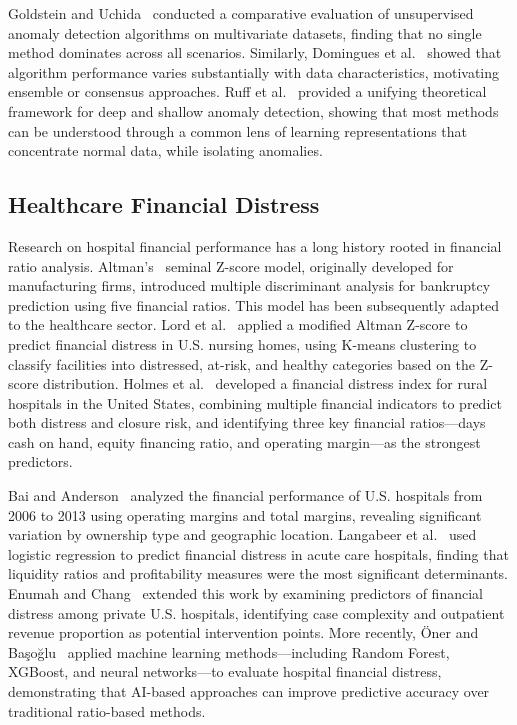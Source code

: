 \documentclass{ieeeaccess}
\begin{document}
Goldstein and Uchida~\cite{goldstein2016comparative} conducted a comparative evaluation of unsupervised anomaly detection algorithms on multivariate datasets, finding that no single method dominates across all scenarios. Similarly, Domingues et al.~\cite{domingues2018comparative} showed that algorithm performance varies substantially with data characteristics, motivating ensemble or consensus approaches. Ruff et al.~\cite{ruff2021unifying} provided a unifying theoretical framework for deep and shallow anomaly detection, showing that most methods can be understood through a common lens of learning representations that concentrate normal data, while isolating anomalies.

\subsection{Healthcare Financial Distress}
\label{subsec:healthcare_distress}
Research on hospital financial performance has a long history rooted in financial ratio analysis. Altman's~\cite{altman1968financial} seminal Z-score model, originally developed for manufacturing firms, introduced multiple discriminant analysis for bankruptcy prediction using five financial ratios. This model has been subsequently adapted to the healthcare sector. Lord et al.~\cite{lord2020predicting} applied a modified Altman Z-score to predict financial distress in U.S. nursing homes, using K-means clustering to classify facilities into distressed, at-risk, and healthy categories based on the Z-score distribution. Holmes et al.~\cite{holmes2017predicting} developed a financial distress index for rural hospitals in the United States, combining multiple financial indicators to predict both distress and closure risk, and identifying three key financial ratios---days cash on hand, equity financing ratio, and operating margin---as the strongest predictors.

Bai and Anderson~\cite{bai2016analysis} analyzed the financial performance of U.S. hospitals from 2006 to 2013 using operating margins and total margins, revealing significant variation by ownership type and geographic location. Langabeer et al.~\cite{langabeer2018predicting} used logistic regression to predict financial distress in acute care hospitals, finding that liquidity ratios and profitability measures were the most significant determinants. Enumah and Chang~\cite{holmes2021predictors} extended this work by examining predictors of financial distress among private U.S. hospitals, identifying case complexity and outpatient revenue proportion as potential intervention points. More recently, {\"O}ner and Ba{\c{s}}o{\u{g}}lu~\cite{oner2024hospital} applied machine learning methods---including Random Forest, XGBoost, and neural networks---to evaluate hospital financial distress, demonstrating that AI-based approaches can improve predictive accuracy over traditional ratio-based methods.
\end{document}
